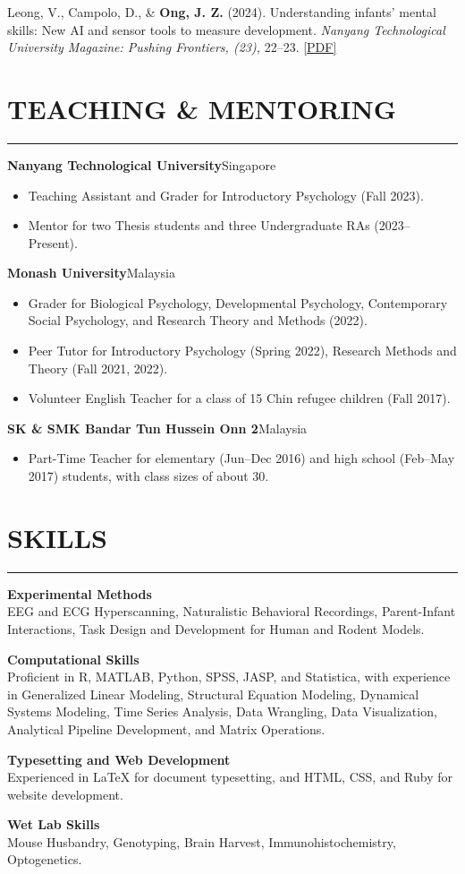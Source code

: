 \documentclass[11pt]{article}
\begin{document}
Leong, V., Campolo, D., \& \textbf{Ong, J. Z.} (2024). Understanding infants’ mental skills: New AI and sensor tools to measure development. \textit{Nanyang Technological University Magazine: Pushing Frontiers, (23),} 22–23. \href{https://jonathanongzm.github.io/assets/pdf/pushing_frontiers.pdf}{[PDF]}

\section*{TEACHING  \&  MENTORING}
\hrule
\textbf{Nanyang Technological University}\hfill Singapore 
\begin{itemize}[leftmargin=1.2cm]
    \item Teaching Assistant and Grader for Introductory Psychology (Fall 2023).
    \item Mentor for two Thesis students and three Undergraduate RAs (2023–Present).
\end{itemize}

\textbf{Monash University}\hfill Malaysia 
\begin{itemize}[leftmargin=1.2cm]
    \item Grader for Biological Psychology, Developmental Psychology, Contemporary Social Psychology, and Research Theory and Methods (2022).
    \item Peer Tutor for Introductory Psychology (Spring 2022), Research Methods and Theory (Fall 2021, 2022).
    \item Volunteer English Teacher for a class of 15 Chin refugee children (Fall 2017).
\end{itemize}

\textbf{SK \& SMK Bandar Tun Hussein Onn 2}\hfill Malaysia 
\begin{itemize}[leftmargin=1.2cm]
    \item Part-Time Teacher for elementary (Jun–Dec 2016) and high school (Feb–May 2017) students, with class sizes of about 30.
\end{itemize}

\section*{SKILLS}
\hrule
\textbf{Experimental Methods} \\
EEG and ECG Hyperscanning, Naturalistic Behavioral Recordings, Parent-Infant Interactions, Task Design and Development for Human and Rodent Models.

\textbf{Computational Skills} \\
Proficient in R, MATLAB, Python, SPSS, JASP, and Statistica, with experience in Generalized Linear Modeling, Structural Equation Modeling, Dynamical Systems Modeling, Time Series Analysis, Data Wrangling, Data Visualization, Analytical Pipeline Development, and Matrix Operations.

\textbf{Typesetting and Web Development} \\
Experienced in \LaTeX{} for document typesetting, and HTML, CSS, and Ruby for website development.

\textbf{Wet Lab Skills} \\
Mouse Husbandry, Genotyping, Brain Harvest, Immunohistochemistry, Optogenetics.
\end{document}
